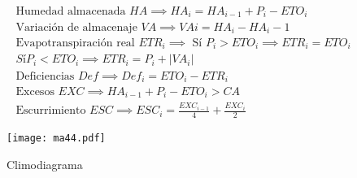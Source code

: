     \begin{align}
        &\text{Humedad almacenada }HA \implies HA_i=HA_{i-1}+P_i-ETO_i\\
        &\text{Variación de almacenaje }VA \implies VAi =HA_i -HA_i- 1\\
        &\text{Evapotranspiración real }ETR_i \implies\text{ Sí }P_i > ETO_i \implies ETR_i = ETO_i\\
        &Sí P_i < ETO_i \implies ETR_i = P_i +\left\lvert VA_i \right\rvert \\
        &\text{Deficiencias }Def \implies Def_i = ETO_i - ETR_i \\
        &\text{Excesos }EXC \implies HA_{i- 1}+ P_i-ETO_i > CA\\
        &\text{Escurrimiento }ESC \implies ESC_i = \frac{EXC_{i-1}}{4} + \frac{EXC_i}{2}
    \end{align}
    \begin{figure}[h!]
    \centering
      \texttt{[image: ma44.pdf]}
      \caption{Climodiagrama}
      \label{ma44}
    \end{figure}


































